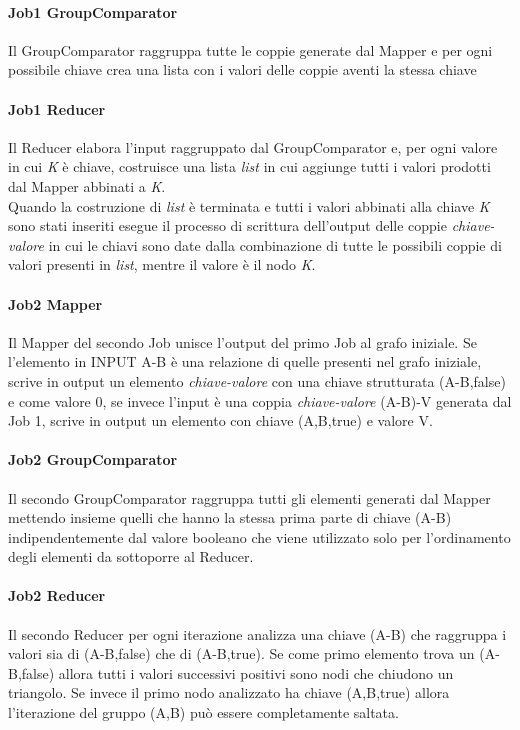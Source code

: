 \documentclass[paper=a4, fontsize=11pt]{scrartcl}	%
\numberwithin{equation}{section}															%
\numberwithin{figure}{section}																%
\numberwithin{table}{section}																%
\begin{document}
\paragraph{Job1 GroupComparator}
Il GroupComparator raggruppa tutte le coppie generate dal Mapper e per ogni possibile chiave crea una lista con i valori delle coppie aventi la stessa chiave
\paragraph{Job1 Reducer}

Il Reducer elabora l'input raggruppato dal GroupComparator e, per ogni valore in cui \textit{K} è chiave, costruisce una lista \textit{list} in cui aggiunge tutti i valori prodotti dal Mapper abbinati a \textit{K}.\\
Quando la costruzione di \textit{list} è terminata e tutti i valori abbinati alla chiave \textit{K} sono stati inseriti esegue il processo di scrittura dell'output delle coppie \textit{chiave-valore} in cui le chiavi sono date dalla combinazione di tutte le possibili coppie di valori presenti in \textit{list}, mentre il valore è il nodo \textit{K}.

\paragraph{Job2 Mapper}
Il Mapper del secondo Job unisce l'output del primo Job al grafo iniziale. Se l'elemento in INPUT A-B è una relazione di quelle presenti nel grafo iniziale, scrive in output un elemento \textit{chiave-valore} con una chiave strutturata (A-B,false) e come valore 0, se invece l'input è una coppia \textit{chiave-valore} (A-B)-V generata dal Job 1, scrive in output un elemento con chiave (A,B,true) e valore V.
\paragraph{Job2 GroupComparator}
Il secondo GroupComparator raggruppa tutti gli elementi generati dal Mapper mettendo insieme quelli che hanno la stessa prima parte di chiave (A-B) indipendentemente dal valore booleano che viene utilizzato solo per l'ordinamento degli elementi da sottoporre al Reducer.

\paragraph{Job2 Reducer}
Il secondo Reducer per ogni iterazione analizza una chiave (A-B) che raggruppa i valori sia di (A-B,false) che di (A-B,true). Se come primo elemento trova un (A-B,false) allora tutti i valori successivi positivi sono nodi che chiudono un triangolo. Se invece il primo nodo analizzato ha chiave (A,B,true) allora l'iterazione del gruppo (A,B) può essere completamente saltata.
\end{document}

